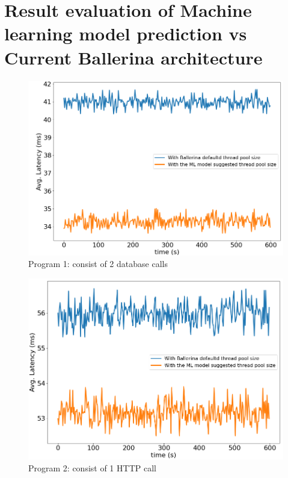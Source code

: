 \section{Result evaluation of Machine learning model prediction vs Current Ballerina architecture}

\begin{figure}[htbp]
	\begin{center}
		\includegraphics[scale=0.5]{figures/ts_db_2.png}
	\end{center}
	\caption{Program 1: consist of 2 database calls }
	\label{ts_db_1}
\end{figure}

\begin{figure}[htbp]
	\begin{center}
		\includegraphics[scale=0.5]{figures/ts_http_1.png}
	\end{center}
	\caption{Program 2: consist of 1 HTTP call}
	\label{ts_http_1}
\end{figure}

